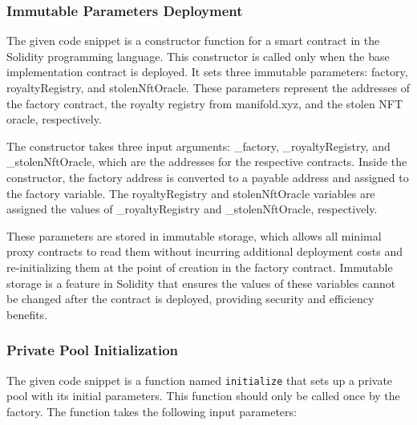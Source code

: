 \hypertarget{immutable-parameters-deployment}{%
\subsubsection{Immutable Parameters
Deployment}\label{immutable-parameters-deployment}}

The given code snippet is a constructor function for a smart contract in
the Solidity programming language. This constructor is called only when
the base implementation contract is deployed. It sets three immutable
parameters: factory, royaltyRegistry, and stolenNftOracle. These
parameters represent the addresses of the factory contract, the royalty
registry from manifold.xyz, and the stolen NFT oracle, respectively.

The constructor takes three input arguments: \_factory,
\_royaltyRegistry, and \_stolenNftOracle, which are the addresses for
the respective contracts. Inside the constructor, the factory address is
converted to a payable address and assigned to the factory variable. The
royaltyRegistry and stolenNftOracle variables are assigned the values of
\_royaltyRegistry and \_stolenNftOracle, respectively.

These parameters are stored in immutable storage, which allows all
minimal proxy contracts to read them without incurring additional
deployment costs and re-initializing them at the point of creation in
the factory contract. Immutable storage is a feature in Solidity that
ensures the values of these variables cannot be changed after the
contract is deployed, providing security and efficiency benefits.

\hypertarget{private-pool-initialization}{%
\subsubsection{Private Pool
Initialization}\label{private-pool-initialization}}

The given code snippet is a function named \texttt{initialize} that sets
up a private pool with its initial parameters. This function should only
be called once by the factory. The function takes the following input
parameters:

